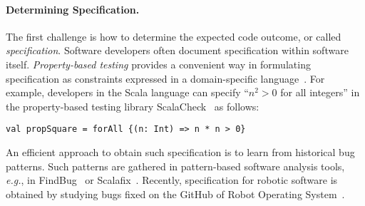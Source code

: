 \documentclass[fleqn,12pt]{article}
\begin{document}
\paragraph{Determining Specification.}
The first challenge is how to determine the expected code outcome, or
called \emph{specification}.  Software developers often document
specification within software itself.  \emph{Property-based testing}
provides a convenient way in formulating specification as constraints
expressed in a domain-specific
language~\cite{DBLP:conf/icfp/ClaessenH00}.  For example, developers
in the Scala language can specify ``$n^2>0$ for all integers'' in the
property-based testing library ScalaCheck~\cite{nilsson2014scalacheck}
as follows:
\begin{lstlisting}[numbers=none]
val propSquare = forAll {(n: Int) => n * n > 0}
\end{lstlisting}
An efficient approach to obtain such specification is to learn from
historical bug patterns. Such patterns are gathered in pattern-based
software analysis tools, {\em e.g.}, in
FindBug~\cite{DBLP:conf/paste/AyewahPMPZ07} or
Scalafix~\cite{web:scalafix}.  Recently, specification for robotic
software is obtained by studying bugs fixed on the GitHub of Robot
Operating System~\cite{nielsenFSW2020dependencybugs}.






\end{document}
